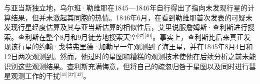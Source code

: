 与亚当斯独立地，乌尔班·勒维耶在1845—1846年自行得出了指向未发现行星的计算结果，但并未激起其同胞的热情。1846年6月，在看到勒维耶首次发表的可疑未发现行星经度估算及其与亚当斯估算的相似性后，艾里说服詹姆斯·查利斯进行搜索。查利斯在整个8月和9月徒劳地搜索天空\(^\text{[37][40]}\)。事实上，查利斯比后来真正发现该行星的约翰·戈特弗里德·加勒早一年观测到了海王星，并在1845年8月4日和12日两次观测到。然而，他过时的星图和糟糕的观测技术使他在后续分析之前未能识别这些观测结果。查利斯充满悔意，但将自己的疏忽归咎于星图以及同时进行彗星观测工作的干扰\(^\text{[41][37][42]}\)。




















